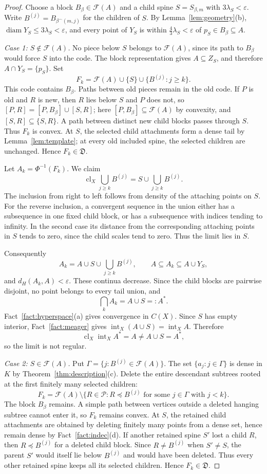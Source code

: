\documentclass[11pt]{amsart}
\theoremstyle{definition}
\theoremstyle{remark}
\newcommand{\clX}{\operatorname{cl}_X}
\newcommand{\intX}{\operatorname{int}_X}
\newcommand{\diam}{\operatorname{diam}}
\newcommand{\Pc}{\mathcal{P}}
\newcommand{\Fc}{\mathcal{F}}
\newcommand{\Dc}{\mathfrak{D}}
\newcommand{\dH}{d_H}
\begin{document}
\begin{proof}
Choose a block $B_\beta\in\Fc(A)$ and a child spine $S=S_{\beta,m}$ with $3\lambda_S<\varepsilon$. Write $B^{(j)}=B_{\beta^\frown(m,j)}$ for the children of $S$. By Lemma~\ref{lem:geometry}(b), $\diam Y_S\le3\lambda_S<\varepsilon$, and every point of $Y_S$ is within $\frac43\lambda_S<\varepsilon$ of $p_S\in B_\beta\subseteq A$.

\emph{Case 1: $S\notin\Fc(A)$.} No piece below $S$ belongs to $\Fc(A)$, since its path to $B_\beta$ would force $S$ into the code. The block representation gives $A\subseteq Z_S$, and therefore $A\cap Y_S=\{p_S\}$. Set
\[
F_k=\Fc(A)\cup\{S\}\cup\{B^{(j)}: j\ge k\}.
\]
This code contains $B_\beta$. Paths between old pieces remain in the old code. If $P$ is old and $R$ is new, then $R$ lies below $S$ and $P$ does not, so $[P,R]=[P,B_\beta]\cup[S,R]$; here $[P,B_\beta]\subseteq\Fc(A)$ by convexity, and $[S,R]\subseteq\{S,R\}$. A path between distinct new child blocks passes through $S$. Thus $F_k$ is convex. At $S$, the selected child attachments form a dense tail by Lemma~\ref{lem:template}; at every old included spine, the selected children are unchanged. Hence $F_k\in\Dc$.

Let $A_k=\Phi^{-1}(F_k)$. We claim
\[
\clX\bigcup_{j\ge k}B^{(j)}=S\cup\bigcup_{j\ge k}B^{(j)}.
\]
The inclusion from right to left follows from density of the attaching points on $S$. For the reverse inclusion, a convergent sequence in the union either has a subsequence in one fixed child block, or has a subsequence with indices tending to infinity. In the second case its distance from the corresponding attaching points in $S$ tends to zero, since the child scales tend to zero. Thus the limit lies in $S$.

Consequently
\[
A_k=A\cup S\cup\bigcup_{j\ge k}B^{(j)},\qquad A\subseteq A_k\subseteq A\cup Y_S,
\]
and $\dH(A_k,A)<\varepsilon$. These continua decrease. Since the child blocks are pairwise disjoint, no point belongs to every tail union, and
\[
\bigcap_kA_k=A\cup S=:A^*.
\]
Fact~\ref{fact:hyperspace}(a) gives convergence in $C(X)$. Since $S$ has empty interior, Fact~\ref{fact:meager} gives $\intX(A\cup S)=\intX A$. Therefore
\[
\clX\intX A^*=A\neq A\cup S=A^*,
\]
so the limit is not regular.

\emph{Case 2: $S\in\Fc(A)$.} Put $\Gamma=\{j: B^{(j)}\in\Fc(A)\}$. The set $\{a_j: j\in\Gamma\}$ is dense in $K$ by Theorem~\ref{thm:description}(c). Delete the entire descendant subtrees rooted at the first finitely many selected children:
\[
F_k=\Fc(A)\setminus\{R\in\Pc: R\preceq B^{(j)}\text{ for some }j\in\Gamma\text{ with }j<k\}.
\]
The block $B_\beta$ remains. A simple path between vertices outside a deleted hanging subtree cannot enter it, so $F_k$ remains convex. At $S$, the retained child attachments are obtained by deleting finitely many points from a dense set, hence remain dense by Fact~\ref{fact:indec}(d). If another retained spine $S'$ lost a child $R$, then $R\preceq B^{(j)}$ for a deleted child block. Since $R\neq B^{(j)}$ when $S'\neq S$, the parent $S'$ would itself lie below $B^{(j)}$ and would have been deleted. Thus every other retained spine keeps all its selected children. Hence $F_k\in\Dc$.


\end{proof}
\end{document}
